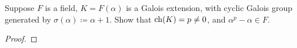 \begin{problem}
Suppose $F$ is a field, $K=F(\alpha)$ is a Galois extension, with cyclic
Galois group generated by $\sigma(\alpha)\coloneqq\alpha+1$. Show that
$\operatorname{ch}(K)=p\neq 0$, and $\alpha^p-\alpha\in F$.
\end{problem}
\begin{proof}
\end{proof}

